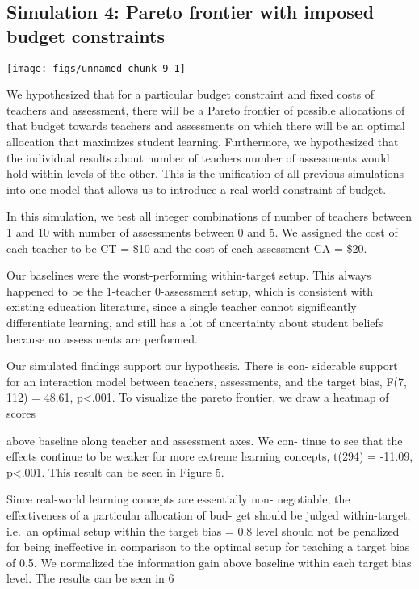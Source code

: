 \documentclass[10pt, letterpaper]{article}
\newenvironment{CodeChunk}{}{}
\begin{document}
\subsection{Simulation 4: Pareto frontier with imposed budget
constraints}\label{simulation-4-pareto-frontier-with-imposed-budget-constraints}

\begin{CodeChunk}

\texttt{[image: figs/unnamed-chunk-9-1]} \end{CodeChunk}

We hypothesized that for a particular budget constraint and fixed costs
of teachers and assessment, there will be a Pareto frontier of possible
allocations of that budget towards teachers and assessments on which
there will be an optimal allocation that maximizes student learning.
Furthermore, we hypothesized that the individual results about number of
teachers number of assessments would hold within levels of the other.
This is the unification of all previous simulations into one model that
allows us to introduce a real-world constraint of budget.

In this simulation, we test all integer combinations of number of
teachers between 1 and 10 with number of assessments between 0 and 5. We
assigned the cost of each teacher to be CT = \$10 and the cost of each
assessment CA = \$20.

Our baselines were the worst-performing within-target setup. This always
happened to be the 1-teacher 0-assessment setup, which is consistent
with existing education literature, since a single teacher cannot
significantly differentiate learning, and still has a lot of uncertainty
about student beliefs because no assessments are performed.

Our simulated findings support our hypothesis. There is con- siderable
support for an interaction model between teachers, assessments, and the
target bias, F(7, 112) = 48.61, p\textless{}.001. To visualize the
pareto frontier, we draw a heatmap of scores

above baseline along teacher and assessment axes. We con- tinue to see
that the effects continue to be weaker for more extreme learning
concepts, t(294) = -11.09, p\textless{}.001. This result can be seen in
Figure 5.

Since real-world learning concepts are essentially non- negotiable, the
effectiveness of a particular allocation of bud- get should be judged
within-target, i.e.~an optimal setup within the target bias = 0.8 level
should not be penalized for being ineffective in comparison to the
optimal setup for teaching a target bias of 0.5. We normalized the
information gain above baseline within each target bias level. The
results can be seen in 6
\end{document}
